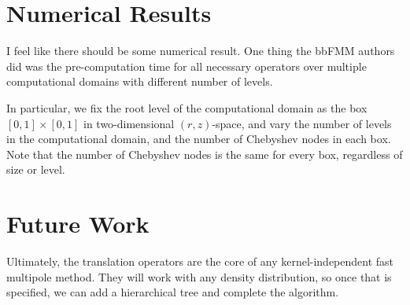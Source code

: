 \documentclass[11pt, oneside]{article}   	%
\begin{document}
\section{Numerical Results}
I feel like there should be some numerical result. One thing the bbFMM authors did was the pre-computation time for all necessary operators over multiple computational domains with different number of levels.

In particular, we fix the root level of the computational domain as the box $[0,1]\times[0,1]$ in two-dimensional $(r,z)$-space, and vary the number of levels in the computational domain, and the number of Chebyshev nodes in each box. Note that the number of Chebyshev nodes is the same for every box, regardless of size or level.

\section{Future Work}
Ultimately, the translation operators are the core of any kernel-independent fast multipole method. They will work with any density distribution, so once that is specified, we can add a hierarchical tree and complete the algorithm.
\end{document}
